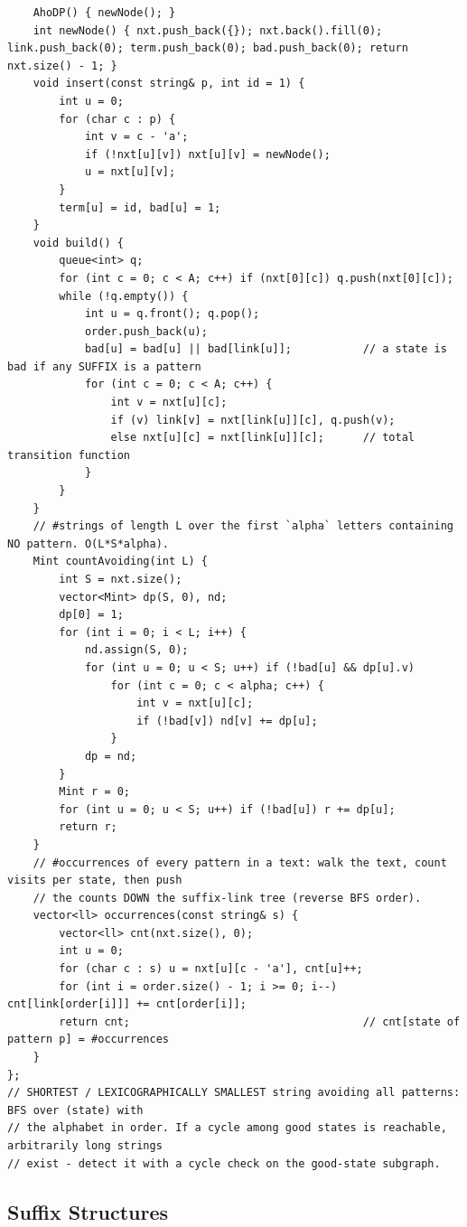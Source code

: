 \documentclass[9pt,a4paper,twocolumn]{extarticle}
\begin{document}
\begin{lstlisting}
    AhoDP() { newNode(); }
    int newNode() { nxt.push_back({}); nxt.back().fill(0); link.push_back(0); term.push_back(0); bad.push_back(0); return nxt.size() - 1; }
    void insert(const string& p, int id = 1) {
        int u = 0;
        for (char c : p) {
            int v = c - 'a';
            if (!nxt[u][v]) nxt[u][v] = newNode();
            u = nxt[u][v];
        }
        term[u] = id, bad[u] = 1;
    }
    void build() {
        queue<int> q;
        for (int c = 0; c < A; c++) if (nxt[0][c]) q.push(nxt[0][c]);
        while (!q.empty()) {
            int u = q.front(); q.pop();
            order.push_back(u);
            bad[u] = bad[u] || bad[link[u]];           // a state is bad if any SUFFIX is a pattern
            for (int c = 0; c < A; c++) {
                int v = nxt[u][c];
                if (v) link[v] = nxt[link[u]][c], q.push(v);
                else nxt[u][c] = nxt[link[u]][c];      // total transition function
            }
        }
    }
    // #strings of length L over the first `alpha` letters containing NO pattern. O(L*S*alpha).
    Mint countAvoiding(int L) {
        int S = nxt.size();
        vector<Mint> dp(S, 0), nd;
        dp[0] = 1;
        for (int i = 0; i < L; i++) {
            nd.assign(S, 0);
            for (int u = 0; u < S; u++) if (!bad[u] && dp[u].v)
                for (int c = 0; c < alpha; c++) {
                    int v = nxt[u][c];
                    if (!bad[v]) nd[v] += dp[u];
                }
            dp = nd;
        }
        Mint r = 0;
        for (int u = 0; u < S; u++) if (!bad[u]) r += dp[u];
        return r;
    }
    // #occurrences of every pattern in a text: walk the text, count visits per state, then push
    // the counts DOWN the suffix-link tree (reverse BFS order).
    vector<ll> occurrences(const string& s) {
        vector<ll> cnt(nxt.size(), 0);
        int u = 0;
        for (char c : s) u = nxt[u][c - 'a'], cnt[u]++;
        for (int i = order.size() - 1; i >= 0; i--) cnt[link[order[i]]] += cnt[order[i]];
        return cnt;                                    // cnt[state of pattern p] = #occurrences
    }
};
// SHORTEST / LEXICOGRAPHICALLY SMALLEST string avoiding all patterns: BFS over (state) with
// the alphabet in order. If a cycle among good states is reachable, arbitrarily long strings
// exist - detect it with a cycle check on the good-state subgraph.
\end{lstlisting}

\subsection{Suffix Structures}
\end{document}
